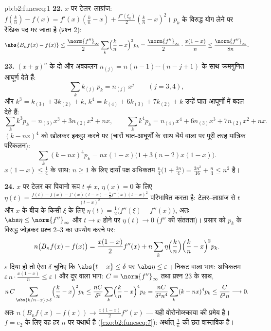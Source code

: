 \begin{solution}{pb:b2:funcseq:1}
\textbf{22.} $x$ पर टेलर--लाग्रांज: $f(\frac kn) - f(x) =
f'(x)(\frac kn - x) + \frac{f''(\xi_k)}2(\frac kn - x)^2$। $p_k$ के विरुद्ध योग लेने पर रैखिक
पद मर जाता है (प्रश्न 2):
\[
\abs{B_nf(x) - f(x)}
\leq \frac{\norm{f''}_\infty}{2}\sum_k\Bigl(\frac kn -
x\Bigr)^2p_k
= \frac{\norm{f''}_\infty}{2}\cdot\frac{x(1-x)}{n}
\leq \frac{\norm{f''}_\infty}{8n} .
\]

\textbf{23.} $(x+y)^n$ के दो और अवकलन $n_{(j)} = n(n-1)\cdots(n-j+1)$ के साथ क्रमगुणित आघूर्ण देते हैं:
\[
\sum_k k_{(j)}\,p_k = n_{(j)}\,x^j \qquad (j = 3, 4),
\]
और $k^3 = k_{(3)} + 3k_{(2)} + k$, $k^4 = k_{(4)} + 6k_{(3)} +
7k_{(2)} + k$ उन्हें घात-आघूर्णों में बदल देते हैं:
\[
\sum_k k^3p_k = n_{(3)}x^3 + 3n_{(2)}x^2 + nx,
\qquad
\sum_k k^4p_k = n_{(4)}x^4 + 6n_{(3)}x^3 + 7n_{(2)}x^2 + nx .
\]
$(k - nx)^4$ को खोलकर इकट्ठा करने पर (चारों घात-आघूर्णों के साथ धैर्य वाला पर
पूरी तरह यांत्रिक परिकलन):
\[
\sum_k(k-nx)^4p_k = nx(1-x)\bigl(1 + 3(n-2)x(1-x)\bigr) .
\]
$x(1-x) \leq \frac14$ के साथ: $n \geq 1$ के लिए दायाँ पक्ष अधिकतम $\frac n4\bigl(1 + \frac{3n}4\bigr) = \frac{3n^2}{16} +
\frac n4 \leq n^2$ है।

\textbf{24.} $x$ पर टेलर का पियानो रूप $t \neq x$, $\eta(x) = 0$ के लिए $\eta(t) =
\frac{f(t) - f(x) - f'(x)(t-x) - \frac12f''(x)(t-x)^2}
{(t-x)^2}$ परिभाषित करता
है: टेलर--लाग्रांज से $t$ और $x$ के बीच के किसी $\xi$ के लिए $\eta(t) = \frac12\bigl(f''(\xi) - f''(x)\bigr)$, अतः $\abs\eta \leq \norm{f''}_\infty$
और $t \to x$ होने पर $\eta(t) \to 0$ ($f''$ की संततता)। प्रसार को $p_k$ के विरुद्ध जोड़कर
प्रश्न 2--3 का उपयोग करने पर:
\[
n\bigl(B_nf(x) - f(x)\bigr)
= \frac{x(1-x)}{2}f''(x)
+ n\sum_k\eta\Bigl(\frac kn\Bigr)\Bigl(\frac kn -
x\Bigr)^2p_k .
\]
$\varepsilon$ दिया हो तो ऐसा $\delta$ चुनिए कि $\abs{t - x}\leq\delta$ पर $\abs\eta \leq
\varepsilon$। निकट वाला भाग: अधिकतम
$\varepsilon\,n\cdot\frac{x(1-x)}n \leq \varepsilon$। और दूर वाला भाग: $C = \norm{f''}_\infty$ तथा प्रश्न 23 के साथ,
\[
n\,C\sum_{\abs{k/n-x}>\delta}\Bigl(\frac kn -
x\Bigr)^2p_k
\leq \frac{nC}{\delta^2}\sum_k\Bigl(\frac kn -
x\Bigr)^4p_k
= \frac{nC}{\delta^2 n^4}\sum_k(k-nx)^4p_k
\leq \frac{C}{\delta^2 n} \longrightarrow 0 .
\]
अतः $n(B_nf(x) - f(x)) \to \frac{x(1-x)}2f''(x)$ --- यही वोरोनोव्स्काया की प्रमेय है। $f = e_2$ के लिए यह हर $n$ पर
यथार्थ है (\cref{exo:b2:funcseq:7}): अर्थात् $\frac1n$ की छत वास्तविक है।


\end{solution}
